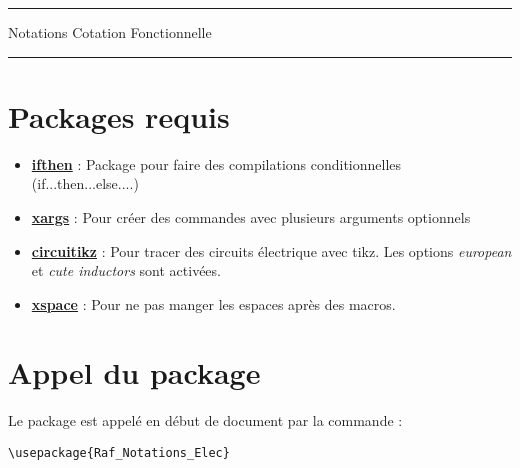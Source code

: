 \documentclass[a4paper,12pt]{article}
\begin{document}
	\begin{center}
		\hrule{\Large Notations Cotation Fonctionnelle}\\\hrule
	\end{center}


	\section{Packages requis}

		\begin{itemize}
			\item \href{http://www.ctan.org/pkg/ifthen}{\textbf{ifthen}} : Package pour faire des compilations conditionnelles (if...then...else....)
			\item \href{http://www.ctan.org/pkg/xargs}{\textbf{xargs}} : Pour créer des commandes avec plusieurs arguments optionnels
			\item \href{https://www.ctan.org/pkg/circuitikz}{\textbf{circuitikz}} : Pour tracer des circuits électrique avec tikz. Les options \emph{european} et \emph{cute inductors} sont activées.
			\item \href{https://www.ctan.org/pkg/xspace}{\textbf{xspace}} : Pour ne pas manger les espaces après des macros.
		\end{itemize}
		
		
	\section{Appel du package}

		Le package est appelé en début de document par la commande :
		\begin{verbatim}
\usepackage{Raf_Notations_Elec}
		\end{verbatim}
\end{document}
